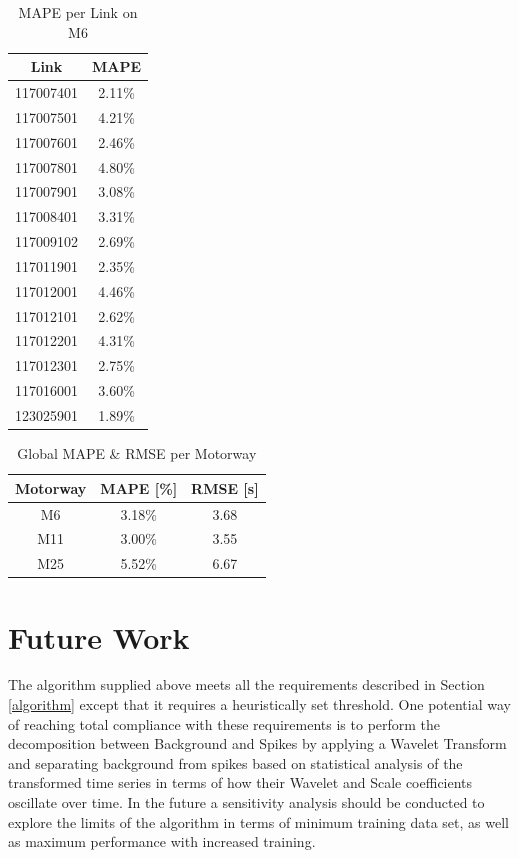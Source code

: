\documentclass[conference, letterpaper]{IEEEtran}
\begin{document}
\begin{table}[htbp]
	\caption{MAPE per Link on M6}
	\begin{center}
		\begin{tabular}{|c|c|}
			\hline
			\textbf{Link}&{\textbf{MAPE}} \\
			\hline
			117007401& 2.11\%\\
			\hline
			117007501& 4.21\%\\
			\hline
			117007601& 2.46\%\\
			\hline
			117007801& 4.80\%\\
			\hline
			117007901& 3.08\%\\
			\hline
			117008401& 3.31\%\\
			\hline
			117009102& 2.69\%\\
			\hline
			117011901& 2.35\%\\
			\hline
			117012001& 4.46\%\\
			\hline
			117012101& 2.62\%\\
			\hline
			117012201& 4.31\%\\
			\hline
			117012301& 2.75\%\\
			\hline
			117016001& 3.60\%\\
			\hline
			123025901& 1.89\%\\
			\hline
		\end{tabular}
		\label{tab1}
	\end{center}
	\label{table:m6mape}
\end{table}

\begin{table}[htbp]
	\caption{Global MAPE \& RMSE per Motorway}
	\begin{center}
		\begin{tabular}{|c|c|c|}
			\hline
			\textbf{Motorway}&{\textbf{MAPE [\%]}}&{\textbf{RMSE [s]}} \\
			\hline
			M6& 3.18\%& 3.68\\
			\hline
			M11& 3.00\%& 3.55\\
			\hline
			M25& 5.52\%& 6.67\\
			\hline
		\end{tabular}
		\label{mapeglobal}
	\end{center}
\end{table}

\section{Future Work}
The algorithm supplied above meets all the requirements described in Section \ref{algorithm} except that it requires a heuristically set threshold. 
One potential way of reaching total compliance with these requirements is to perform the decomposition between Background and Spikes by applying a Wavelet Transform and separating background from spikes based on statistical analysis of the transformed time series in terms of how their Wavelet and Scale coefficients oscillate over time. 
In the future a sensitivity analysis should be conducted to explore the limits of the algorithm in terms of minimum training data set, as well as maximum performance with increased training.
\end{document}

